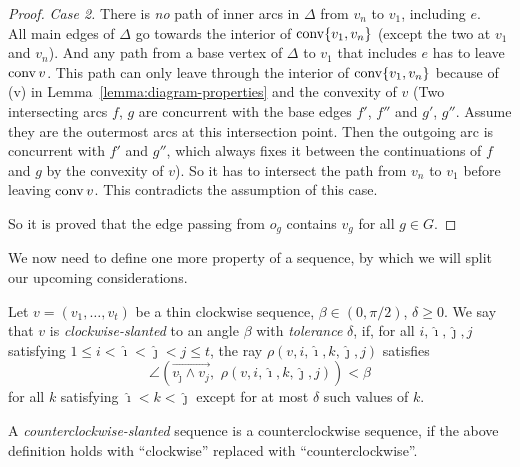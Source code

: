 \begin{proof}
  \textit{Case 2.} There is \emph{no} path of inner arcs in $\Delta$ from $v_n$ to $v_1$, including $e$.\\
  All main edges of $\Delta$ go towards the interior of $\operatorname{conv} \{v_1, v_n\}$ (except the two at $v_1$ and $v_n$). And any path from a base vertex of $\Delta$ to $v_1$ that includes $e$ has to leave $\operatorname{conv} v$. This path can only leave through the interior of $\operatorname{conv}\{v_1,v_n\}$ because of (v) in Lemma~\ref{lemma:diagram-properties} and the convexity of $v$
  (Two intersecting arcs $f$, $g$ are concurrent with the base edges $f'$, $f''$ and $g'$, $g''$. Assume they are the outermost arcs at this intersection point. Then the outgoing arc is concurrent with $f'$ and $g''$, which always fixes it between the continuations of $f$ and $g$ by the convexity of $v$).
  So it has to intersect the path from $v_n$ to $v_1$ before leaving $\operatorname{conv} v$. This contradicts the assumption of this case.

  So it is proved that the edge passing from $o_g$ contains $v_g$ for all $g \in G$.
\end{proof}

We now need to define one more property of a sequence, by which we will split our upcoming considerations.

\begin{definition}
  Let $v=(v_1,\ldots,v_t)$ be a thin clockwise sequence, ${\beta\in(0,\pi/2)}$, $\delta\geqslant 0$. We say that $v$ is \emph{clockwise-slanted} to an angle $\beta$ with \emph{tolerance} $\delta$, if, for all $i,\hat{\imath},\hat{\jmath}, j$ satisfying $1\leqslant i<\hat{\imath}<\hat{\jmath}<j\leqslant t$, the ray ${\rho}(v,i,\hat{\imath},k,\hat{\jmath}, j)$ satisfies $$\angle\left(\overrightarrow{v_{\hat{\jmath}}\wedge v_j},\,\,\rho(v,i,\hat{\imath},k,\hat{\jmath}, j)\right)<\beta$$ for all $k$ satisfying $\hat{\imath}<k<\hat{\jmath}$ except for at most $\delta$ such values of $k$. 

  A \emph{counterclockwise-slanted} sequence is a counterclockwise sequence, if the above definition holds with ``clockwise'' replaced with ``counterclockwise''.
\end{definition}

